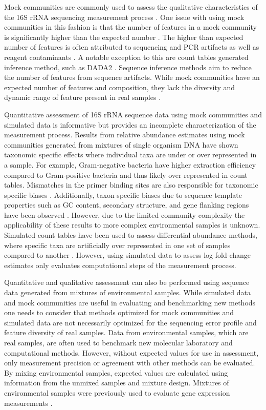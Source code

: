 \documentclass[linenumbers]{bmcart}
\begin{document}
Mock communities are commonly used to assess the qualitative
characteristics of the 16S rRNA sequencing measurement process
\cite{bokulich2016mockrobiota}. One issue with using mock communities
in this fashion is that the number of features in a mock
community is significantly higher than the expected number
\cite{Kopylova2014}. The higher than expected number of features is
often attributed to sequencing and PCR artifacts as well as reagent
contaminants \cite{brooks2015truth, Huse2010}. A notable exception to
this are count tables generated inference method,
such as DADA2 \cite{callahan2016dada2}. Sequence
inference methods aim to reduce the number of features from sequence artifacts.
While mock communities have an expected number of features and
composition, they lack the diversity and dynamic range of feature
present in real samples \cite{bokulich2016mockrobiota}.

Quantitative assessment of 16S rRNA sequence data using mock communities and
simulated data is informative but provides an
incomplete characterization of the measurement process.
Results from relative abundance estimates using mock communities generated from
mixtures of single organism DNA have shown taxonomic specific effects
where individual taxa are under or over represented in a sample. For
example, Gram-negative bacteria have higher extraction efficiency
compared to Gram-positive bacteria and thus likely over represented
in count tables\cite{Costea2017, Olson2012}.
Mismatches in the primer binding sites are also responsible for
taxonomic specific biases
\cite{brooks2015truth, klindworth2012evaluation, Gohl2016}.
Additionally, taxon specific biases due to sequence template properties
such as GC content, secondary structure, and gene flanking regions have
been observed \cite{Pinto2012, Hansen1998, Gohl2016}.
However, due to the limited community complexity the applicability of
these results to more complex environmental samples is unknown. Simulated count
tables have been used to assess differential abundance methods, where specific taxa are
artificially over represented in one set of samples compared to another
\cite{McMurdie2014}. However, using simulated data to assess log fold-change
estimates only evaluates computational steps of the measurement process.

Quantitative and qualitative assessment can also be performed using
sequence data generated from mixtures of environmental samples. While
simulated data and mock communities are useful in evaluating and
benchmarking new methods one needs to consider that methods optimized
for mock communities and simulated data are not necessarily optimized
for the sequencing error profile and feature diversity of real samples.
Data from environmental samples, which are real samples, are often used
to benchmark new molecular laboratory and computational methods.
However, without expected values for use in assessment, only measurement
precision or agreement with other methods can be evaluated. By mixing
environmental samples, expected values are calculated using information
from the unmixed samples and mixture design. Mixtures of environmental
samples were previously used to evaluate gene expression measurements
\cite{parsons2015using, pine2011adaptable, thompson2005use}.
\end{document}
